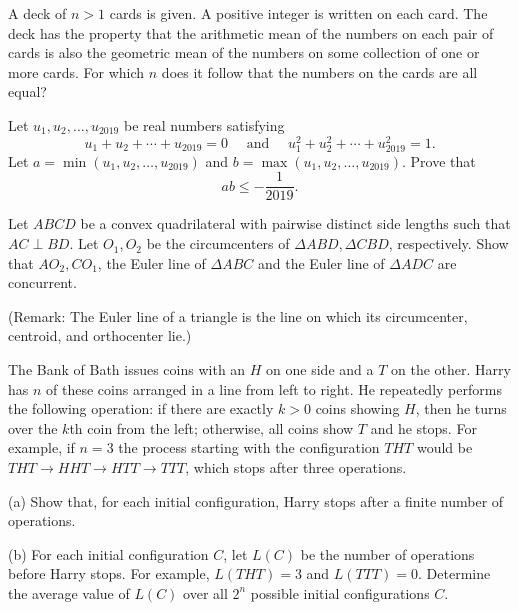 \documentclass[11pt]{scrartcl}
\begin{document}
\begin{problem}[3859961452154270883]
	A deck of $n > 1$ cards is given. A positive integer is written on each card. The deck has the property that the arithmetic mean of the numbers on each pair of cards is also the geometric mean of the numbers on some collection of one or more cards.
For which $n$ does it follow that the numbers on the cards are all equal?
\end{problem}
\begin{problem}[3192129869376364982]
Let $u_1, u_2, \dots, u_{2019}$ be real numbers satisfying\[u_{1}+u_{2}+\cdots+u_{2019}=0 \quad \text { and } \quad u_{1}^{2}+u_{2}^{2}+\cdots+u_{2019}^{2}=1.\]Let $a=\min \left(u_{1}, u_{2}, \ldots, u_{2019}\right)$ and $b=\max \left(u_{1}, u_{2}, \ldots, u_{2019}\right)$. Prove that
\[
a b \leqslant-\frac{1}{2019}.
\]
\end{problem}
\begin{problem}[8963205841174892420]
	Let $ABCD$ be a convex quadrilateral with pairwise distinct side lengths such that $AC\perp BD$. Let $O_1,O_2$ be the circumcenters of $\Delta ABD, \Delta CBD$, respectively. Show that $AO_2, CO_1$, the Euler line of $\Delta ABC$ and the Euler line of $\Delta ADC$ are concurrent.

(Remark: The Euler line of a triangle is the line on which its circumcenter, centroid, and orthocenter lie.)
\end{problem}
\begin{problem}[623590906176957]
	The Bank of Bath issues coins with an $H$ on one side and a $T$ on the other. Harry has $n$ of these coins arranged in a line from left to right. He repeatedly performs the following operation: if there are exactly $k>0$ coins showing $H$, then he turns over the $k$th coin from the left; otherwise, all coins show $T$ and he stops. For example, if $n=3$ the process starting with the configuration $THT$ would be $THT \to HHT  \to HTT \to TTT$, which stops after three operations.

(a) Show that, for each initial configuration, Harry stops after a finite number of operations.

(b) For each initial configuration $C$, let $L(C)$ be the number of operations before Harry stops. For example, $L(THT) = 3$ and $L(TTT) = 0$. Determine the average value of $L(C)$ over all $2^n$ possible initial configurations $C$.
\end{problem}
\end{document}
